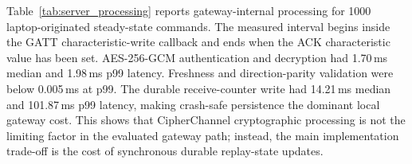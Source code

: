 \documentclass[journal]{IEEEtran}
\begin{document}
Table~\ref{tab:server_processing} reports gateway-internal processing for 1000 laptop-originated steady-state commands. The measured interval begins inside the GATT characteristic-write callback and ends when the ACK characteristic value has been set. AES-256-GCM authentication and decryption had 1.70\,ms median and 1.98\,ms p99 latency. Freshness and direction-parity validation were below 0.005\,ms at p99. The durable receive-counter write had 14.21\,ms median and 101.87\,ms p99 latency, making crash-safe persistence the dominant local gateway cost. This shows that CipherChannel cryptographic processing is not the limiting factor in the evaluated gateway path; instead, the main implementation trade-off is the cost of synchronous durable replay-state updates.

\begin{table}[!t]
\renewcommand{\arraystretch}{1.12}
\caption{Gateway-Side Receive-to-ACK Processing Breakdown for Laptop-Originated Commands (ms, $N=1000$)}
\label{tab:server_processing}
\centering
{}
\end{table}
\end{document}
